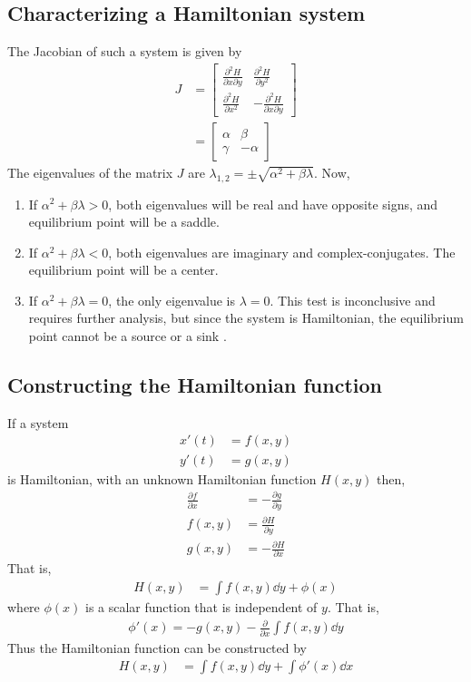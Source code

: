 \documentclass[12pt,1in]{article}
\begin{document}
\subsection{Characterizing a Hamiltonian system}
The Jacobian of such a system is given by 
\begin{align}
J &= \begin{bmatrix}
\frac{\partial^2H}{\partial x \partial y} & \frac{\partial^2H}{\partial y^2} \\
\frac{\partial^2H}{\partial x^2} & -\frac{\partial^2H}{\partial x \partial y}
\end{bmatrix} \\
&= \begin{bmatrix}
\alpha & \beta \\
\gamma & -\alpha
\end{bmatrix}
\end{align}
The eigenvalues of the matrix $J$ are $\lambda_{1,2} = \pm \sqrt{\alpha^2 + \beta\lambda}$. Now,
\begin{enumerate}
	\item If $\alpha^2 + \beta\lambda > 0$, both eigenvalues will be real and have opposite signs, and equilibrium point will be a saddle. 
	\item If $\alpha^2 + \beta\lambda < 0$, both eigenvalues are imaginary and complex-conjugates. The equilibrium  point will be a center. 
	\item If $\alpha^2 + \beta\lambda = 0$, the only eigenvalue is $\lambda = 0$. This test is inconclusive and requires further analysis, but since the system is Hamiltonian, the equilibrium point cannot be a source or a sink \cite{diff_eq}.  
\end{enumerate}
\subsection{Constructing the Hamiltonian function \label{sec:constructing_hamiltonian}}
If a system 
\begin{align}
x'(t) &= f(x,y) \\
y'(t) &= g(x,y)
\end{align}
is Hamiltonian, with an unknown Hamiltonian function $H(x,y)$ then, \cite{diff_eq}
\begin{align}
\frac{\partial f}{\partial x} &= -\frac{\partial g}{\partial y}  \\
f(x,y) &= \frac{\partial H}{\partial y} \\
g(x,y) &=  - \frac{\partial H}{\partial x}
\end{align}
That is,
\begin{align}
H(x,y) &= \int f(x,y) \dd{y} + \phi(x)
\end{align}
where $\phi(x)$ is a scalar function that is independent of $y$. That is,
\begin{align}
\phi'(x) = - g ( x , y ) - \frac { \partial } { \partial x } \int f ( x , y ) \dd{y}
\end{align}
Thus the Hamiltonian function can be constructed by 
\begin{align}
H(x,y) &= \int f(x,y) \dd{y} + \int \phi'(x) \dd{x}
\end{align}
\end{document}
